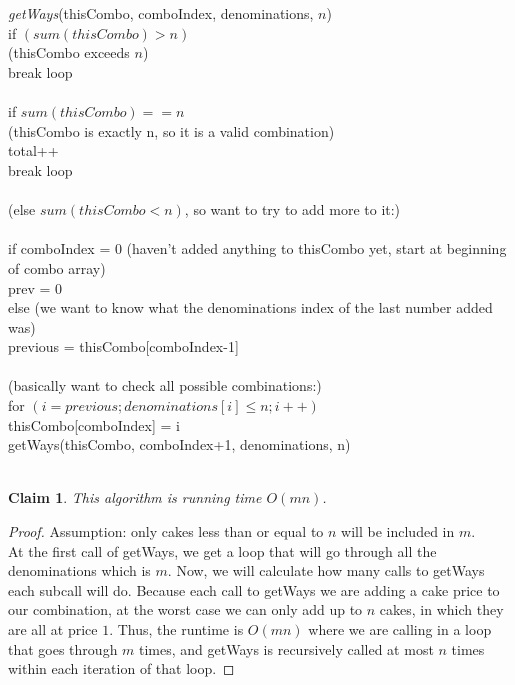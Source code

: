 \documentclass[11pt]{article}
\newtheorem{claim}[theorem]{Claim}
\begin{document}
 	\\
 	\\
 	\textit{getWays}(thisCombo, comboIndex, denominations, $n$)\\
 	\indent	if $(sum(thisCombo) > n)$\\
 	\indent \indent (thisCombo exceeds $n$)\\
 	\indent \indent break loop\\
	\\ 			
 	\indent	if $sum(thisCombo) == n$\\
 	\indent	\indent	(thisCombo is exactly n, so it is a valid combination)\\
 	\indent	\indent	total++\\
 	\indent	\indent	break loop\\
 	\\
 	\indent	(else $sum(thisCombo < n)$, so want to try to add more to it:)\\
 	\\
 	\indent	if comboIndex = 0 (haven't added anything to thisCombo yet, start at beginning of combo array)\\
 	\indent	\indent	prev = 0\\
 	\indent	else (we want to know what the denominations index of the last number added was) \\
 	\indent	\indent	previous = thisCombo[comboIndex-1]\\
 	\\		
 	\indent	(basically want to check all possible combinations:)\\
 	\indent	for $(i = previous; denominations[i] \leq n; i++)$\\
	\indent	\indent	thisCombo[comboIndex] = i\\
	\indent	\indent	getWays(thisCombo, comboIndex+1, denominations, n)\\
 	\\
	
	
	\begin{claim} 
		This algorithm is running time $O(mn)$.
	\end{claim}
	
	\begin{proof}
		Assumption: only cakes less than or equal to $n$ will be included in $m$.\\ 
		At the first call of getWays, we get a loop that will go through all the denominations which is $m$. Now, we will calculate how many calls to getWays each subcall will do. Because each call to getWays we are adding a cake price to our combination, at the worst case we can only add up to $n$ cakes, in which they are all at price $1$. Thus, the runtime is $O(mn)$ where we are calling in a loop that goes through $m$ times, and getWays is recursively called at most $n$ times within each iteration of that loop. 
	\end{proof}
	
\end{document}
